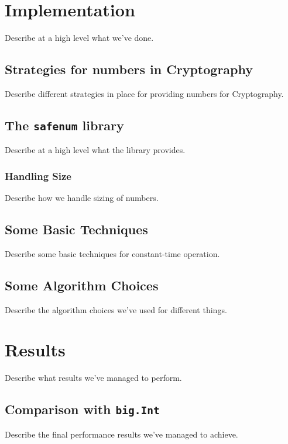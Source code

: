 \documentclass[11pt, a4paper, twocolumn]{article} %
\begin{document}
{\section{Implementation}

Describe at a high level what we've done.

\subsection{Strategies for numbers in Cryptography}

Describe different strategies in place for providing numbers for
Cryptography.

\subsection{The \texttt{safenum} library}

Describe at a high level what the library provides.

\subsubsection{Handling Size}

Describe how we handle sizing of numbers.

\subsection{Some Basic Techniques}

Describe some basic techniques for constant-time operation.

\subsection{Some Algorithm Choices}

Describe the algorithm choices we've used for different things.

\section{Results}

Describe what results we've managed to perform.

\subsection{Comparison with \texttt{big.Int}}

Describe the final performance results we've managed to achieve.

}
\end{document}
